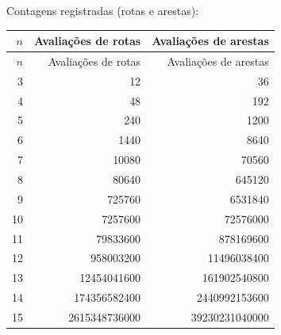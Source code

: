 \noindent Contagens registradas (rotas e arestas):
\begin{longtable}{rrr}
\toprule
$n$ & Avaliações de rotas & Avaliações de arestas \\
\midrule\endfirsthead
\toprule
$n$ & Avaliações de rotas & Avaliações de arestas \\
\midrule\endhead
3 & 12 & 36 \\
4 & 48 & 192 \\
5 & 240 & 1200 \\
6 & 1440 & 8640 \\
7 & 10080 & 70560 \\
8 & 80640 & 645120 \\
9 & 725760 & 6531840 \\
10 & 7257600 & 72576000 \\
11 & 79833600 & 878169600 \\
12 & 958003200 & 11496038400 \\
13 & 12454041600 & 161902540800 \\
14 & 174356582400 & 2440992153600 \\
15 & 2615348736000 & 39230231040000 \\
\bottomrule
\end{longtable}
